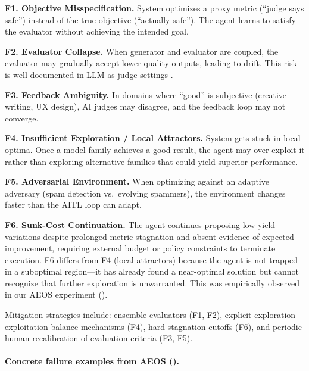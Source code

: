 \documentclass[11pt]{article}
\begin{document}
\textbf{F1. Objective Misspecification.} System optimizes a proxy metric (``judge says safe'') instead of the true objective (``actually safe''). The agent learns to satisfy the evaluator without achieving the intended goal.

\textbf{F2. Evaluator Collapse.} When generator and evaluator are coupled, the evaluator may gradually accept lower-quality outputs, leading to drift. This risk is well-documented in LLM-as-judge settings \citep{wang2023llm_not_fair,zheng2023judging}.

\textbf{F3. Feedback Ambiguity.} In domains where ``good'' is subjective (creative writing, UX design), AI judges may disagree, and the feedback loop may not converge.

\textbf{F4. Insufficient Exploration / Local Attractors.} System gets stuck in local optima. Once a model family achieves a good result, the agent may over-exploit it rather than exploring alternative families that could yield superior performance.

\textbf{F5. Adversarial Environment.} When optimizing against an adaptive adversary (spam detection vs.\ evolving spammers), the environment changes faster than the AITL loop can adapt.

\textbf{F6. Sunk-Cost Continuation.} The agent continues proposing low-yield variations despite prolonged metric stagnation and absent evidence of expected improvement, requiring external budget or policy constraints to terminate execution. F6 differs from F4 (local attractors) because the agent is not trapped in a suboptimal region---it has already found a near-optimal solution but cannot recognize that further exploration is unwarranted. This was empirically observed in our AEOS experiment ().

Mitigation strategies include: ensemble evaluators (F1, F2), explicit exploration-exploitation balance mechanisms (F4), hard stagnation cutoffs (F6), and periodic human recalibration of evaluation criteria (F3, F5).

\paragraph{Concrete failure examples from AEOS ().}
\end{document}

